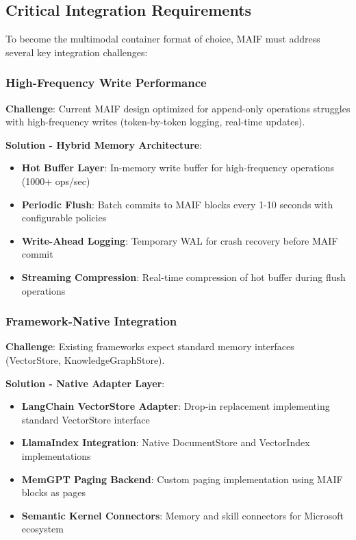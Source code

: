 \documentclass[conference]{IEEEtran}
\begin{document}
\subsection{Critical Integration Requirements}

To become the multimodal container format of choice, MAIF must address several key integration challenges:

\subsubsection{High-Frequency Write Performance}

\textbf{Challenge}: Current MAIF design optimized for append-only operations struggles with high-frequency writes (token-by-token logging, real-time updates).

\textbf{Solution - Hybrid Memory Architecture}:
\begin{itemize}[leftmargin=*]
\item \textbf{Hot Buffer Layer}: In-memory write buffer for high-frequency operations (1000+ ops/sec)
\item \textbf{Periodic Flush}: Batch commits to MAIF blocks every 1-10 seconds with configurable policies
\item \textbf{Write-Ahead Logging}: Temporary WAL for crash recovery before MAIF commit
\item \textbf{Streaming Compression}: Real-time compression of hot buffer during flush operations
\end{itemize}

\subsubsection{Framework-Native Integration}

\textbf{Challenge}: Existing frameworks expect standard memory interfaces (VectorStore, KnowledgeGraphStore).

\textbf{Solution - Native Adapter Layer}:
\begin{itemize}[leftmargin=*]
\item \textbf{LangChain VectorStore Adapter}: Drop-in replacement implementing standard VectorStore interface
\item \textbf{LlamaIndex Integration}: Native DocumentStore and VectorIndex implementations
\item \textbf{MemGPT Paging Backend}: Custom paging implementation using MAIF blocks as pages
\item \textbf{Semantic Kernel Connectors}: Memory and skill connectors for Microsoft ecosystem
\end{itemize}
\end{document}
